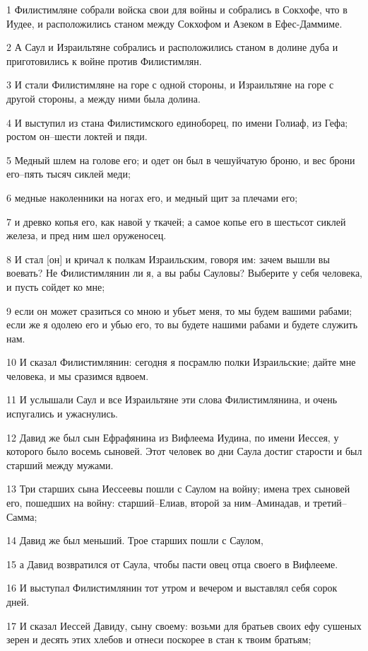 \par 1 Филистимляне собрали войска свои для войны и собрались в Сокхофе, что в Иудее, и расположились станом между Сокхофом и Азеком в Ефес-Даммиме.
\par 2 А Саул и Израильтяне собрались и расположились станом в долине дуба и приготовились к войне против Филистимлян.
\par 3 И стали Филистимляне на горе с одной стороны, и Израильтяне на горе с другой стороны, а между ними была долина.
\par 4 И выступил из стана Филистимского единоборец, по имени Голиаф, из Гефа; ростом он--шести локтей и пяди.
\par 5 Медный шлем на голове его; и одет он был в чешуйчатую броню, и вес брони его--пять тысяч сиклей меди;
\par 6 медные наколенники на ногах его, и медный щит за плечами его;
\par 7 и древко копья его, как навой у ткачей; а самое копье его в шестьсот сиклей железа, и пред ним шел оруженосец.
\par 8 И стал [он] и кричал к полкам Израильским, говоря им: зачем вышли вы воевать? Не Филистимлянин ли я, а вы рабы Сауловы? Выберите у себя человека, и пусть сойдет ко мне;
\par 9 если он может сразиться со мною и убьет меня, то мы будем вашими рабами; если же я одолею его и убью его, то вы будете нашими рабами и будете служить нам.
\par 10 И сказал Филистимлянин: сегодня я посрамлю полки Израильские; дайте мне человека, и мы сразимся вдвоем.
\par 11 И услышали Саул и все Израильтяне эти слова Филистимлянина, и очень испугались и ужаснулись.
\par 12 Давид же был сын Ефрафянина из Вифлеема Иудина, по имени Иессея, у которого было восемь сыновей. Этот человек во дни Саула достиг старости и был старший между мужами.
\par 13 Три старших сына Иессеевы пошли с Саулом на войну; имена трех сыновей его, пошедших на войну: старший--Елиав, второй за ним--Аминадав, и третий--Самма;
\par 14 Давид же был меньший. Трое старших пошли с Саулом,
\par 15 а Давид возвратился от Саула, чтобы пасти овец отца своего в Вифлееме.
\par 16 И выступал Филистимлянин тот утром и вечером и выставлял себя сорок дней.
\par 17 И сказал Иессей Давиду, сыну своему: возьми для братьев своих ефу сушеных зерен и десять этих хлебов и отнеси поскорее в стан к твоим братьям;
